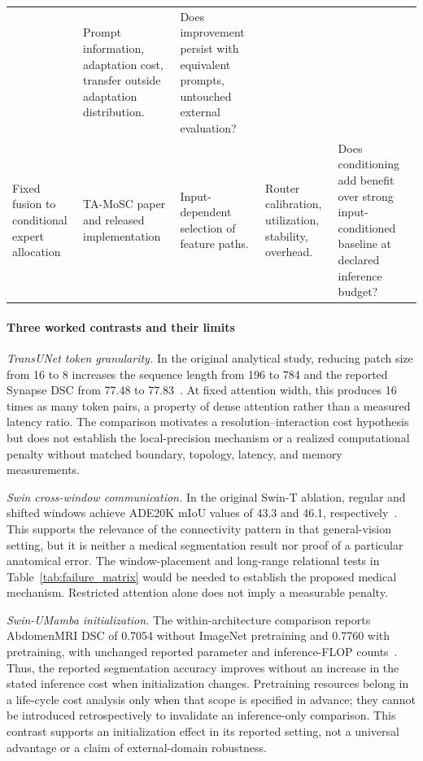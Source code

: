 \documentclass[5p,times,authoryear]{elsarticle}
\begin{document}
\begin{table}[t]
\begin{tabular}{>{\raggedright\arraybackslash}p{2.7cm}>{\raggedright\arraybackslash}p{3.05cm}>{\raggedright\arraybackslash}p{3.15cm}>{\raggedright\arraybackslash}p{3.45cm}>{\raggedright\arraybackslash}p{3.8cm}}
& Prompt information, adaptation cost, transfer outside adaptation distribution.
& Does improvement persist with equivalent prompts, untouched external evaluation? \\
Fixed fusion to conditional expert allocation
& TA-MoSC paper and released implementation \citep{luo2025tamosc_verified,luo2025tamosc_code_verified}
& Input-dependent selection of feature paths.
& Router calibration, utilization, stability, overhead.
& Does conditioning add benefit over strong input-conditioned baseline at declared inference budget? \\
\bottomrule
\end{tabular}
\end{table}

\paragraph{Three worked contrasts and their limits}
\emph{TransUNet token granularity.} In the original analytical study, reducing patch size from 16 to 8 increases the sequence length from 196 to 784 and the reported Synapse DSC from 77.48 to 77.83~\citep{chen2021transunet}. At fixed attention width, this produces 16 times as many token pairs, a property of dense attention rather than a measured latency ratio. The comparison motivates a resolution--interaction cost hypothesis but does not establish the local-precision mechanism or a realized computational penalty without matched boundary, topology, latency, and memory measurements.

\emph{Swin cross-window communication.} In the original Swin-T ablation, regular and shifted windows achieve ADE20K mIoU values of 43.3 and 46.1, respectively~\citep{review95_liu2021swin}. This supports the relevance of the connectivity pattern in that general-vision setting, but it is neither a medical segmentation result nor proof of a particular anatomical error. The window-placement and long-range relational tests in Table~\ref{tab:failure_matrix} would be needed to establish the proposed medical mechanism. Restricted attention alone does not imply a measurable penalty.

\emph{Swin-UMamba initialization.} The within-architecture comparison reports AbdomenMRI DSC of 0.7054 without ImageNet pretraining and 0.7760 with pretraining, with unchanged reported parameter and inference-FLOP counts~\citep{liu2024swin}. Thus, the reported segmentation accuracy improves without an increase in the stated inference cost when initialization changes. Pretraining resources belong in a life-cycle cost analysis only when that scope is specified in advance; they cannot be introduced retrospectively to invalidate an inference-only comparison. This contrast supports an initialization effect in its reported setting, not a universal advantage or a claim of external-domain robustness.
\end{document}
